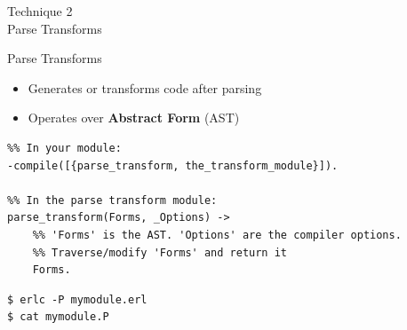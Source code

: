 \documentclass[c]{beamer}
\begin{document}
\begin{frame}[c]
  \begin{center}
    \Huge Technique 2 \\ Parse Transforms
  \end{center}
\end{frame}


\begin{frame}[fragile]{Parse Transforms}
  \begin{itemize}
  \item Generates or transforms code after parsing
  \item Operates over \textbf{Abstract Form} (AST)
  \end{itemize}

  \begin{lstlisting}
%% In your module:
-compile([{parse_transform, the_transform_module}]).

%% In the parse transform module:
parse_transform(Forms, _Options) ->
    %% 'Forms' is the AST. 'Options' are the compiler options.
    %% Traverse/modify 'Forms' and return it
    Forms.
  \end{lstlisting}
  \pause
\begin{verbatim}
$ erlc -P mymodule.erl
$ cat mymodule.P
\end{verbatim}
\end{frame}
\end{document}
